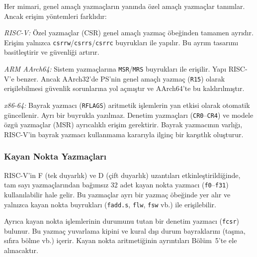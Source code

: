 \begin{karsilastirma}
Her mimari, genel amaçlı yazmaçların yanında özel amaçlı yazmaçlar tanımlar. Ancak erişim yöntemleri farklıdır:

\emph{RISC-V:} Özel yazmaçlar (CSR) genel amaçlı yazmaç öbeğinden tamamen ayrıdır. Erişim yalnızca \texttt{csrrw}/\texttt{csrrs}/\texttt{csrrc} buyrukları ile yapılır. Bu ayrım tasarımı basitleştirir ve güvenliği artırır.

\emph{ARM AArch64:} Sistem yazmaçlarına \texttt{MSR}/\texttt{MRS} buyrukları ile erişilir. Yapı RISC-V'e benzer. Ancak AArch32'de PS'nin genel amaçlı yazmaç (\texttt{R15}) olarak erişilebilmesi güvenlik sorunlarına yol açmıştır ve AArch64'te bu kaldırılmıştır.

\emph{x86-64:} Bayrak yazmacı (\texttt{RFLAGS}) aritmetik işlemlerin yan etkisi olarak otomatik güncellenir. Ayrı bir buyrukla yazılmaz. Denetim yazmaçları (\texttt{CR0}--\texttt{CR4}) ve modele özgü yazmaçlar (MSR) ayrıcalıklı erişim gerektirir. Bayrak yazmacının varlığı, RISC-V'in bayrak yazmacı kullanmama kararıyla ilginç bir karşıtlık oluşturur.
\end{karsilastirma}

\subsubsection{Kayan Nokta Yazmaçları}

RISC-V'in F (tek duyarlık) ve D (çift duyarlık) uzantıları etkinleştirildiğinde, tam sayı yazmaçlarından bağımsız 32 adet kayan nokta yazmacı (\texttt{f0}--\texttt{f31}) kullanılabilir hale gelir. Bu yazmaçlar ayrı bir yazmaç öbeğinde yer alır ve yalnızca kayan nokta buyrukları (\texttt{fadd.s}, \texttt{flw}, \texttt{fsw} vb.) ile erişilebilir.

Ayrıca kayan nokta işlemlerinin durumunu tutan bir denetim yazmacı (\texttt{fcsr}) bulunur. Bu yazmaç yuvarlama kipini ve kural dışı durum bayraklarını (taşma, sıfıra bölme vb.) içerir. Kayan nokta aritmetiğinin ayrıntıları Bölüm~5'te ele alınacaktır.

